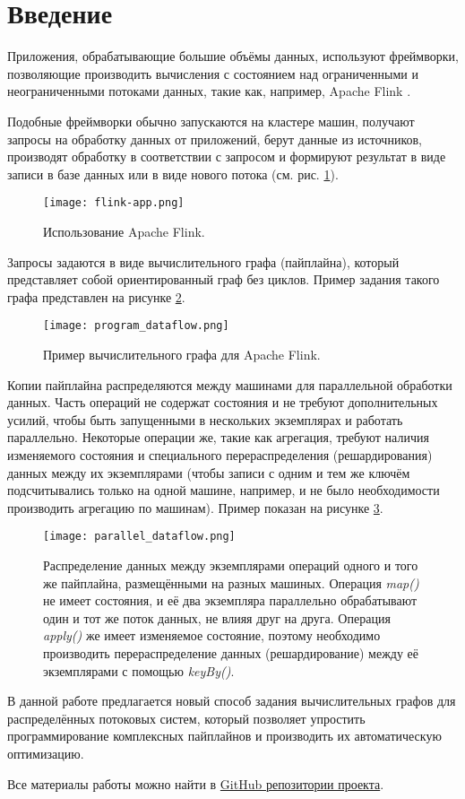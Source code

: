 \section{Введение}

Приложения, обрабатывающие большие объёмы данных, используют фреймворки, позволяющие производить вычисления с состоянием над ограниченными и неограниченными потоками данных, такие как, например, Apache Flink \cite{flink-org}.

Подобные фреймворки обычно запускаются на кластере машин, получают запросы на обработку данных от приложений, берут данные из источников, производят обработку в соответствии с запросом и формируют результат в виде записи в базе данных или в виде нового потока (см. рис. \ref{fig:flink-app}).

\begin{figure}[h]
    \texttt{[image: flink-app.png]}
    \caption{Использование Apache Flink.}
    \label{fig:flink-app}
\end{figure}

Запросы задаются в виде вычислительного графа (пайплайна), который представляет собой ориентированный граф без циклов. Пример задания такого графа представлен на рисунке \ref{fig:prog-data}.

\begin{figure}
    \texttt{[image: program\_dataflow.png]}
    \caption{Пример вычислительного графа для Apache Flink.}
    \label{fig:prog-data}
\end{figure}

Копии пайплайна распределяются между машинами для параллельной обработки данных.
Часть операций не содержат состояния и не требуют дополнительных усилий, чтобы быть запущенными в нескольких экземплярах и работать параллельно.
Некоторые операции же, такие как агрегация, требуют наличия изменяемого состояния и специального перераспределения (решардирования) данных между их экземплярами (чтобы записи с одним и тем же ключём подсчитывались только на одной машине, например, и не было необходимости производить агрегацию по машинам). Пример показан на рисунке \ref{fig:par-data}.

\begin{figure}
    \texttt{[image: parallel\_dataflow.png]}
    \caption{Распределение данных между экземплярами операций одного и того же пайплайна, размещёнными на разных машиных. Операция \textit{map()} не имеет состояния, и её два экземпляра параллельно обрабатывают один и тот же поток данных, не влияя друг на друга. Операция \textit{apply()} же имеет изменяемое состояние, поэтому необходимо производить перераспределение данных (решардирование) между её экземплярами с помощью \textit{keyBy()}.}
    \label{fig:par-data}
\end{figure}

В данной работе предлагается новый способ задания вычислительных графов для распределённых потоковых систем, который позволяет упростить программирование комплексных пайплайнов и производить их автоматическую оптимизацию.

Все материалы работы можно найти в \href{https://github.com/flame-stream/calco}{GitHub репозитории проекта}.
